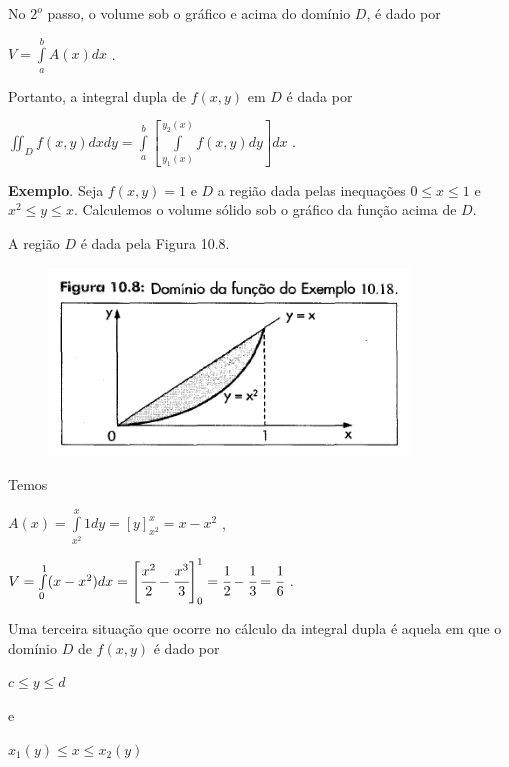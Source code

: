 			No $2^{o}$ passo, o volume sob o gráfico e acima do domínio $D$, é dado por

			\medskip

			$V = \int \limits^{b}_{a} A(x)dx$ .

			\medskip

			Portanto, a integral dupla de $f(x, y)$ em $D$ é dada por

			\medskip

			$\iint_{D} f(x, y)dxdy = \int \limits^{b}_{a} \left[ \int \limits^{y_{2}(x)}_{y_{1}(x)} f(x, y)dy \right] dx$ .

			\bigskip

			\textbf{Exemplo}. Seja $f(x, y) = 1$ e $D$  a região dada pelas inequações $0 \leq x \leq 1$ e $x^{2} \leq y \leq x$. Calculemos o volume sólido sob o gráfico da função acima de $D$.

			A região $D$ é dada pela Figura 10.8.

			\begin{figure}[H]
				\includegraphics[height=5cm]{images/morettin_figura-10-8}
			\end{figure}

			Temos

			\medskip

			$A(x) = \int \limits^{x}_{x^{2}} 1dy = [y]^{x}_{x^{2}} = x - x^{2}$ ,

			$V = \int \limits^{1}_{0} (x - x^{2})dx = \left[ \cfrac{x^{2}}{2} - \cfrac{x^{3}}{3} \right]^{1}_{0} = \cfrac{1}{2} - \cfrac{1}{3} = \cfrac{1}{6}$ .

			\bigskip

			Uma terceira situação que ocorre no cálculo da integral dupla é aquela em que o domínio $D$ de $f(x, y)$ é dado por

			\medskip

			$c \leq y \leq d$

			\smallskip

			e

			\smallskip

			$x_{1}(y) \leq x \leq x_{2}(y)$


